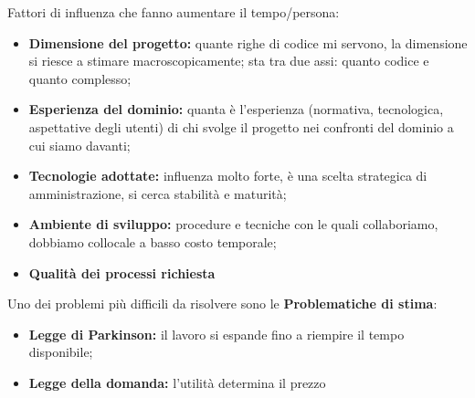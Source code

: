 Fattori di influenza che fanno aumentare il tempo/persona:
\begin{itemize}
	\item \textbf{Dimensione del progetto:} quante righe di codice mi servono, la dimensione si riesce a stimare macroscopicamente; sta tra due assi: quanto codice e quanto complesso;
	\item \textbf{Esperienza del dominio:} quanta è l'esperienza (normativa, tecnologica, aspettative degli utenti) di chi svolge il progetto nei confronti del dominio a cui siamo davanti;
	\item \textbf{Tecnologie adottate:} influenza molto forte, è una scelta strategica di amministrazione, si cerca stabilità e maturità;
	\item \textbf{Ambiente di sviluppo:} procedure e tecniche con le quali collaboriamo, dobbiamo collocale a basso costo temporale;
	\item \textbf{Qualità dei processi richiesta}
\end{itemize}

Uno dei problemi più difficili da risolvere sono le \textbf{Problematiche di stima}:
\begin{itemize}
	\item \textbf{Legge di Parkinson:} il lavoro si espande fino a riempire il tempo disponibile;
	\item \textbf{Legge della domanda:} l'utilità determina il prezzo
\end{itemize}




